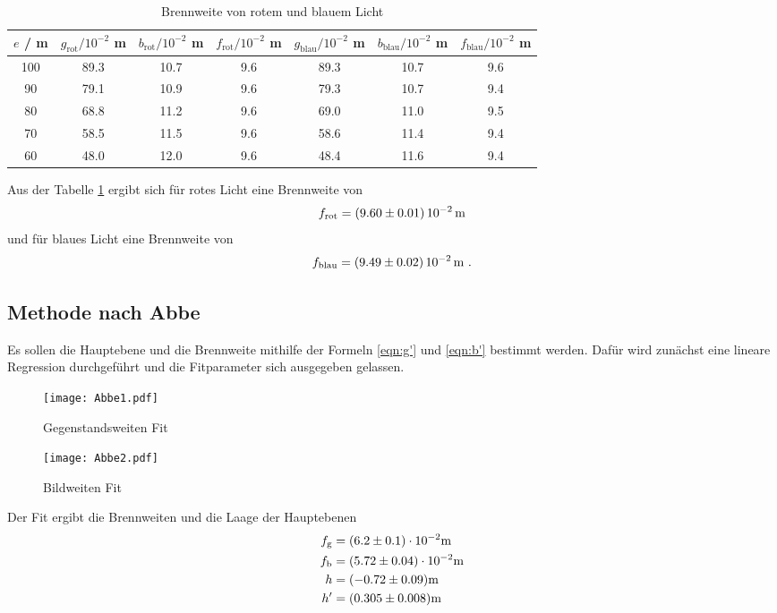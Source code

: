 \begin{table}
  \centering
  \begin{tabular}{c | c c c || c c c}
    \toprule
    $e$ / m & $g_\text{rot} / 10^{-2}$ m & $b_\text{rot} / 10^{-2}$ m & $f_\text{rot} / 10^{-2}$ m & $g_\text{blau} / 10^{-2}$ m & $b_\text{blau} / 10^{-2}$ m & $f_\text{blau} / 10^{-2}$ m \\
    \midrule
    100	& 89.3	& 10.7	& 9.6 &	89.3 & 10.7 & 9.6	\\
    90	& 79.1	& 10.9	& 9.6 & 79.3 & 10.7 & 9.4	\\
    80	& 68.8	& 11.2	& 9.6 & 69.0 & 11.0 & 9.5	\\
    70	& 58.5	& 11.5	& 9.6 & 58.6 & 11.4 & 9.4	\\
    60	& 48.0	& 12.0	& 9.6 & 48.4 & 11.6 & 9.4	\\
    \bottomrule
  \end{tabular}
  \caption{Brennweite von rotem und blauem Licht}
  \label{tab:fbesslf}
\end{table}
Aus der Tabelle \ref{tab:fbesslf} ergibt sich für rotes Licht eine Brennweite von
\begin{equation}
  f_\text{rot} = (\num{9.60 +- 0.01}) \, 10^{-2} \, \text{m}
  \label{eqn:frot}
\end{equation} 
und für blaues Licht eine Brennweite von 
\begin{equation}
  f_\text{blau} = (\num{9.49 +- 0.02}) \, 10^{-2} \, \text{m} \ .
  \label{fblau}
\end{equation}

\subsection{Methode nach Abbe}
Es sollen die Hauptebene und die Brennweite mithilfe der Formeln \ref{eqn:g'} und \ref{eqn:b'} bestimmt werden. Dafür wird zunächst eine lineare Regression durchgeführt und die Fitparameter sich ausgegeben gelassen. 
\begin{figure}
  \centering
    \texttt{[image: Abbe1.pdf]}
  \caption{Gegenstandsweiten Fit}
  \label{fig:<+label+>}
\end{figure}
\begin{figure}
  \centering
  \texttt{[image: Abbe2.pdf]}
  \caption{Bildweiten Fit}
  \label{fig:<+label+>}
\end{figure}
Der Fit ergibt die Brennweiten und die Laage der Hauptebenen
\begin{eqnarray}
  f_\text{g} &= (\num{ 6.2+- 0.1}) \cdot 10^{-2} \text{m} \\ 
  f_\text{b} &= (\num{ 5.72 +- 0.04 }) \cdot 10^{-2} \text{m} \\
  h &= (\num{ -0.72 +- 0.09}) \text{m} \\
  h' &= (\num{ 0.305 +- 0.008}) \text{m} 
  \label{eqn:abbedf}
\end{eqnarray}
